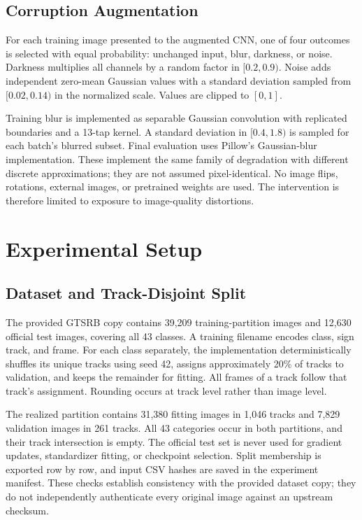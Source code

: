 \documentclass[conference]{IEEEtran}
\begin{document}
\subsection{Corruption Augmentation}
For each training image presented to the augmented CNN, one of four outcomes is selected with equal probability: unchanged input, blur, darkness, or noise. Darkness multiplies all channels by a random factor in $[0.2,0.9)$. Noise adds independent zero-mean Gaussian values with a standard deviation sampled from $[0.02,0.14)$ in the normalized scale. Values are clipped to $[0,1]$.

Training blur is implemented as separable Gaussian convolution with replicated boundaries and a 13-tap kernel. A standard deviation in $[0.4,1.8)$ is sampled for each batch's blurred subset. Final evaluation uses Pillow's Gaussian-blur implementation. These implement the same family of degradation with different discrete approximations; they are not assumed pixel-identical. No image flips, rotations, external images, or pretrained weights are used. The intervention is therefore limited to exposure to image-quality distortions.

\section{Experimental Setup}
\subsection{Dataset and Track-Disjoint Split}
The provided GTSRB copy contains 39,209 training-partition images and 12,630 official test images, covering all 43 classes. A training filename encodes class, sign track, and frame. For each class separately, the implementation deterministically shuffles its unique tracks using seed 42, assigns approximately 20\% of tracks to validation, and keeps the remainder for fitting. All frames of a track follow that track's assignment. Rounding occurs at track level rather than image level.

The realized partition contains 31,380 fitting images in 1,046 tracks and 7,829 validation images in 261 tracks. All 43 categories occur in both partitions, and their track intersection is empty. The official test set is never used for gradient updates, standardizer fitting, or checkpoint selection. Split membership is exported row by row, and input CSV hashes are saved in the experiment manifest. These checks establish consistency with the provided dataset copy; they do not independently authenticate every original image against an upstream checksum.
\end{document}
